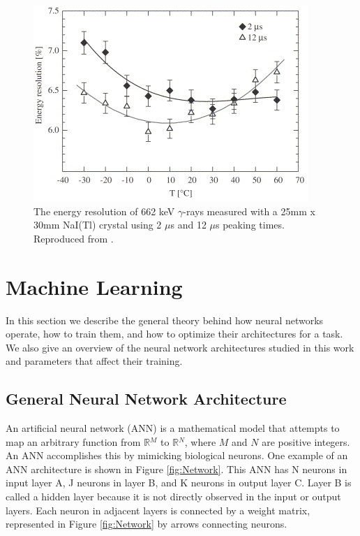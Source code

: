 \begin{figure}[H]
\centering
\includegraphics[width=0.95\linewidth]{images/temp-dependence-resolution-moszynski}
\caption{The energy resolution of 662 keV $\gamma$-rays measured with a 25mm x 30mm NaI(Tl) crystal using 2 $\mu$s and 12 $\mu$s peaking times. Reproduced from \cite{MOSZYNSKI2006739}.}
\label{fig:temp-dependence-resolution-moszynski}
\end{figure}

\section{Machine Learning}

In this section we describe the general theory behind how neural networks operate, how to train them, and how to optimize their architectures for a task. We also give an overview of the neural network architectures studied in this work and parameters that affect their training.

\subsection{General Neural Network Architecture}

An artificial neural network (ANN) is a mathematical model that attempts to map an arbitrary function from $\mathbb{R}{^M}$ to $\mathbb{R}{^N}$, where $M$ and $N$ are positive integers. An ANN accomplishes this by mimicking biological neurons. One example of an ANN architecture is shown in Figure \ref{fig:Network}. This ANN has N neurons in input layer A, J neurons in layer B, and K neurons in output layer C. Layer B is called a hidden layer because it is not directly observed in the input or output layers. Each neuron in adjacent layers is connected by a weight matrix, represented in Figure \ref{fig:Network} by arrows connecting neurons.


